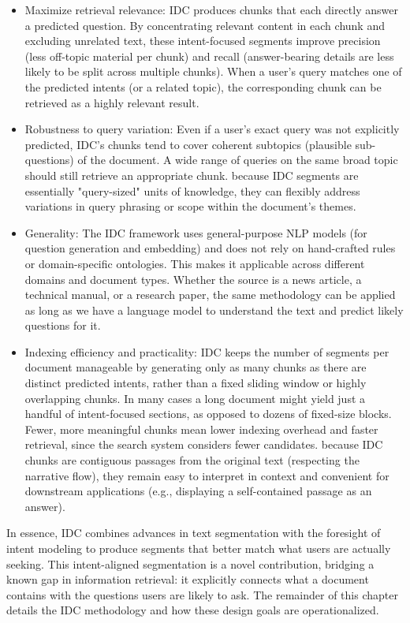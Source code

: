 \documentclass[12pt,a4paper]{report}
\begin{document}
\begin{itemize}
\item Maximize retrieval relevance: IDC produces chunks that each directly answer a predicted question. By concentrating relevant content in each chunk and excluding unrelated text, these intent-focused segments improve precision (less off-topic material per chunk) and recall (answer-bearing details are less likely to be split across multiple chunks). When a user's query matches one of the predicted intents (or a related topic), the corresponding chunk can be retrieved as a highly relevant result.

\item Robustness to query variation: Even if a user's exact query was not explicitly predicted, IDC's chunks tend to cover coherent subtopics (plausible sub-questions) of the document. A wide range of queries on the same broad topic should still retrieve an appropriate chunk. because IDC segments are essentially "query-sized" units of knowledge, they can flexibly address variations in query phrasing or scope within the document's themes.

\item Generality: The IDC framework uses general-purpose NLP models (for question generation and embedding) and does not rely on hand-crafted rules or domain-specific ontologies. This makes it applicable across different domains and document types. Whether the source is a news article, a technical manual, or a research paper, the same methodology can be applied as long as we have a language model to understand the text and predict likely questions for it.

\item Indexing efficiency and practicality: IDC keeps the number of segments per document manageable by generating only as many chunks as there are distinct predicted intents, rather than a fixed sliding window or highly overlapping chunks. In many cases a long document might yield just a handful of intent-focused sections, as opposed to dozens of fixed-size blocks. Fewer, more meaningful chunks mean lower indexing overhead and faster retrieval, since the search system considers fewer candidates. because IDC chunks are contiguous passages from the original text (respecting the narrative flow), they remain easy to interpret in context and convenient for downstream applications (e.g., displaying a self-contained passage as an answer).
\end{itemize}

In essence, IDC combines advances in text segmentation with the foresight of intent modeling to produce segments that better match what users are actually seeking. This intent-aligned segmentation is a novel contribution, bridging a known gap in information retrieval: it explicitly connects what a document contains with the questions users are likely to ask. The remainder of this chapter details the IDC methodology and how these design goals are operationalized.
\end{document}
